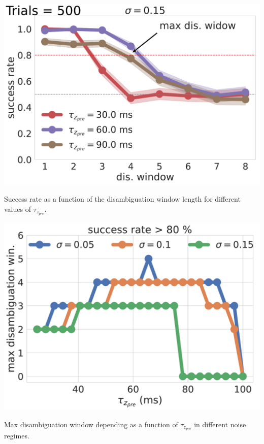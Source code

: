 \documentclass[landscape , a0, final]{baposter}
\begin{document}
\begin{poster}
{\begin{center}
\includegraphics[scale=0.20]{noise2.pdf}

\smaller Success rate as a function of the disambiguation window length for different values of $\tau_{z_{pre}}$.
\end{center}

\begin{center}
\includegraphics[scale=0.20]{noise.pdf}

\smaller Max disambiguation window depending as a function of $\tau_{z_{pre}}$ in different noise regimes. 
\end{center}



}




\end{poster}
\end{document}
